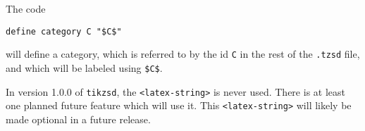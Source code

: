 \documentclass{amsart}
\newcommand{\vlength}{0.2cm}
\begin{document}
\begin{example}
The code
\vspace{\vlength}
\begin{verbatim}
define category C "$C$"
\end{verbatim}
\vspace{\vlength}
\noindent will define a category, which is referred to by the id \texttt{C} in the rest of the
\texttt{.tzsd} file, and which will be labeled using \texttt{\$C\$}.
\end{example}
\begin{remark}
In version 1.0.0 of \texttt{tikzsd}, the \texttt{<latex-string>} is never used.
There is at least one planned future feature which will use it.
This \texttt{<latex-string>} will likely be made optional in a future release.
\end{remark}
\end{document}
